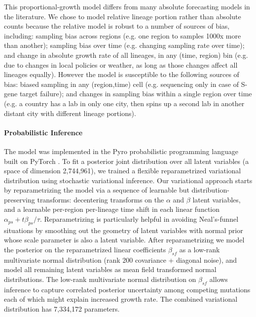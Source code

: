 \documentclass[12pt]{article}
\begin{document}
This proportional-growth model differs from many absolute forecasting models in the literature.
We chose to model relative lineage portion rather than absolute counts because the relative model is robust to a number of sources of bias, including:
sampling bias across regions (e.g. one region to samples 1000x more than another);
sampling bias over time (e.g. changing sampling rate over time); and
change in absolute growth rate of all lineages, in any (time, region) bin (e.g. due to changes in local policies or weather, as long as those changes affect all lineages equally).
However the model is susceptible to the following sources of bias:
biased sampling in any (region,time) cell (e.g. sequencing only in case of S-gene target failure); and changes in sampling bias within a single region over time (e.g. a country has a lab in only one city, then spins up a second lab in another distant city with different lineage portions).

\paragraph*{Probabilistic Inference}

The model was implemented in the Pyro probabilistic programming language \cite{bingham2019pyro} built on PyTorch \cite{paszke2017automatic}.
To fit a posterior joint distribution over all latent variables (a space of dimension 2,744,961), we trained a flexible reparametrized variational distribution using stochastic variational inference.
Our variational approach starts by reparametrizing the model via a sequence of learnable but distribution-preserving transforms: decentering transforms \cite{gorinova2020automatic} on the $\alpha$ and $\beta$ latent variables, and a learnable per-region per-lineage time shift in each linear function $\alpha_{ps}+t\beta_{ps}/\tau$.
Reparametrizing is particularly helpful in avoiding Neal's-funnel situations \cite{neal2003slice} by smoothing out the geometry of latent variables with normal prior whose scale parameter is also a latent variable.
After reparametrizing we model the posterior on the reparametrized linear coefficients $\beta_{sf}$ as a low-rank multivariate normal distribution (rank 200 covariance + diagonal noise), and model all remaining latent variables as mean field transformed normal distributions.
The low-rank multivariate normal distribution on $\beta_{sf}$ allows inference to capture correlated posterior uncertainty among competing mutations each of which might explain increased growth rate.
The combined variational distribution has 7,334,172 parameters.
\end{document}
